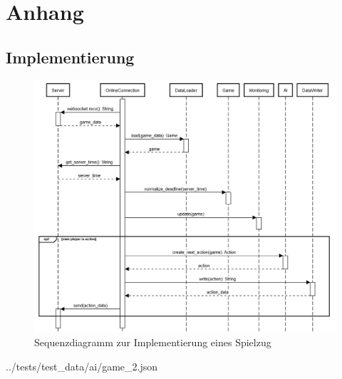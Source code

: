 \chapter{Anhang}
\label{ch:anhang}

\section{Implementierung}
\label{sec:anhang-implementierung}

\begin{figure}[htb]
	\centering
	\includegraphics[width=13.5cm]{Bilder/Sequenzdiagramm_Implementierung_Spielzug.png}
	\caption{Sequenzdiagramm zur Implementierung eines Spielzug}
	\label{fig:sequenzdiagramm-spielzug}
\end{figure}

\begin{minipage}{\textwidth}
	
	{../tests/test_data/ai/game_2.json}
\end{minipage}